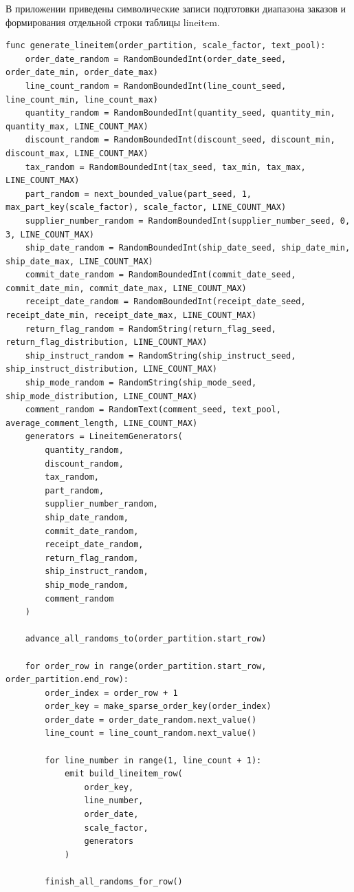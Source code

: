 \setcounter{appendixlstbase}{\value{lstlisting}}
\renewcommand{\thelstlisting}{\Asbuk{appendicesnum}.\number\numexpr\value{lstlisting}-\value{appendixlstbase}\relax}
\label{appendix:lineitem}

В приложении приведены символические записи подготовки диапазона заказов и
формирования отдельной строки таблицы lineitem.

\begin{lstlisting}[style=reportpseudocode,caption={Подготовка диапазона заказов для lineitem},label={lst:app-lineitem-range}]
func generate_lineitem(order_partition, scale_factor, text_pool):
    order_date_random = RandomBoundedInt(order_date_seed, order_date_min, order_date_max)
    line_count_random = RandomBoundedInt(line_count_seed, line_count_min, line_count_max)
    quantity_random = RandomBoundedInt(quantity_seed, quantity_min, quantity_max, LINE_COUNT_MAX)
    discount_random = RandomBoundedInt(discount_seed, discount_min, discount_max, LINE_COUNT_MAX)
    tax_random = RandomBoundedInt(tax_seed, tax_min, tax_max, LINE_COUNT_MAX)
    part_random = next_bounded_value(part_seed, 1, max_part_key(scale_factor), scale_factor, LINE_COUNT_MAX)
    supplier_number_random = RandomBoundedInt(supplier_number_seed, 0, 3, LINE_COUNT_MAX)
    ship_date_random = RandomBoundedInt(ship_date_seed, ship_date_min, ship_date_max, LINE_COUNT_MAX)
    commit_date_random = RandomBoundedInt(commit_date_seed, commit_date_min, commit_date_max, LINE_COUNT_MAX)
    receipt_date_random = RandomBoundedInt(receipt_date_seed, receipt_date_min, receipt_date_max, LINE_COUNT_MAX)
    return_flag_random = RandomString(return_flag_seed, return_flag_distribution, LINE_COUNT_MAX)
    ship_instruct_random = RandomString(ship_instruct_seed, ship_instruct_distribution, LINE_COUNT_MAX)
    ship_mode_random = RandomString(ship_mode_seed, ship_mode_distribution, LINE_COUNT_MAX)
    comment_random = RandomText(comment_seed, text_pool, average_comment_length, LINE_COUNT_MAX)
    generators = LineitemGenerators(
        quantity_random,
        discount_random,
        tax_random,
        part_random,
        supplier_number_random,
        ship_date_random,
        commit_date_random,
        receipt_date_random,
        return_flag_random,
        ship_instruct_random,
        ship_mode_random,
        comment_random
    )

    advance_all_randoms_to(order_partition.start_row)

    for order_row in range(order_partition.start_row, order_partition.end_row):
        order_index = order_row + 1
        order_key = make_sparse_order_key(order_index)
        order_date = order_date_random.next_value()
        line_count = line_count_random.next_value()

        for line_number in range(1, line_count + 1):
            emit build_lineitem_row(
                order_key,
                line_number,
                order_date,
                scale_factor,
                generators
            )

        finish_all_randoms_for_row()
\end{lstlisting}

